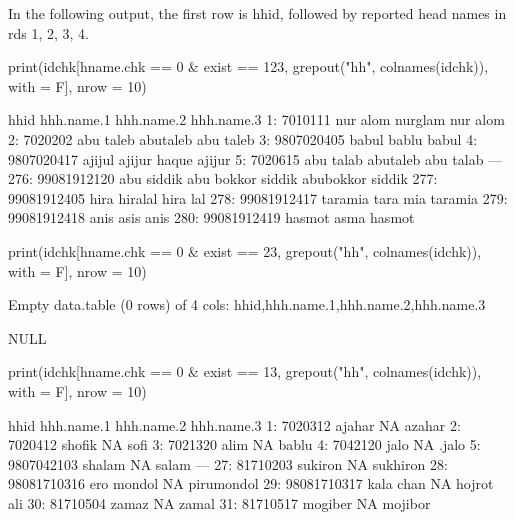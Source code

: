 In the following output, the first row is \textsf{hhid}, followed by reported head names in rds 1, 2, 3, 4.
\begin{Schunk}
\begin{Sinput}
print(idchk[hname.chk == 0  & exist == 123, 
	grepout("hh", colnames(idchk)), with = F], nrow = 10)
\end{Sinput}
\begin{Soutput}
            hhid hhh.name.1        hhh.name.2       hhh.name.3
  1:     7010111   nur alom           nurglam         nur alom
  2:     7020202  abu taleb          abutaleb        abu taleb
  3:  9807020405      babul             bablu            babul
  4:  9807020417     ajijul      ajijur haque           ajijur
  5:     7020615  abu talab          abutaleb        abu talab
 ---                                                          
276: 99081912120 abu siddik abu bokkor siddik abubokkor siddik
277: 99081912405       hira           hiralal         hira lal
278: 99081912417    taramia          tara mia          taramia
279: 99081912418       anis              asis             anis
280: 99081912419     hasmot              asma           hasmot
\end{Soutput}
\begin{Sinput}
print(idchk[hname.chk == 0  & exist == 23, 
	grepout("hh", colnames(idchk)), with = F], nrow = 10)
\end{Sinput}
\begin{Soutput}
Empty data.table (0 rows) of 4 cols: hhid,hhh.name.1,hhh.name.2,hhh.name.3
\end{Soutput}
\begin{Soutput}
NULL
\end{Soutput}
\begin{Sinput}
print(idchk[hname.chk == 0  & exist == 13, 
	grepout("hh", colnames(idchk)), with = F], nrow = 10)
\end{Sinput}
\begin{Soutput}
           hhid hhh.name.1 hhh.name.2 hhh.name.3
 1:     7020312     ajahar         NA     azahar
 2:     7020412     shofik         NA       sofi
 3:     7021320       alim         NA      bablu
 4:     7042120       jalo         NA      .jalo
 5:  9807042103     shalam         NA      salam
---                                             
27:    81710203    sukiron         NA   sukhiron
28: 98081710316 ero mondol         NA pirumondol
29: 98081710317  kala chan         NA hojrot ali
30:    81710504      zamaz         NA      zamal
31:    81710517    mogiber         NA    mojibor
\end{Soutput}

\end{Schunk}

